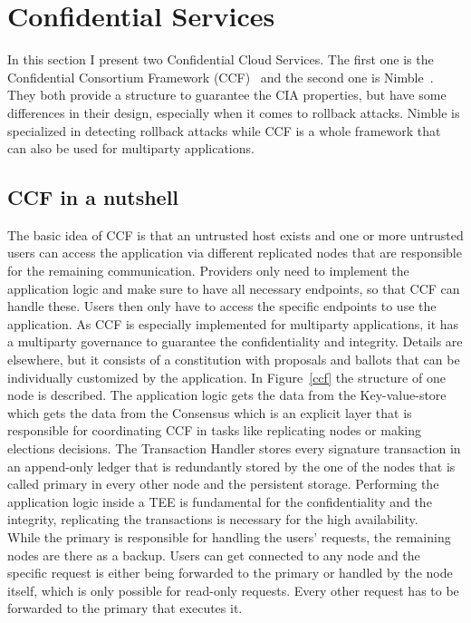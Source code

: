 \section{Confidential Services}
In this section I present two Confidential Cloud Services. The first one is the Confidential Consortium Framework (CCF)~\cite{Howard} and the second one is Nimble~\cite{Nimble}. They both provide a structure to guarantee the CIA properties, but have some differences in their design, especially when it comes to rollback attacks. Nimble is specialized in detecting rollback attacks while CCF is a whole framework that can also be used for multiparty applications.

\subsection{CCF in a nutshell}
The basic idea of CCF is that an untrusted host exists and one or more untrusted users can access the application via different replicated nodes that are responsible for the remaining communication. Providers only need to implement the application logic and make sure to have all necessary endpoints, so that CCF can handle these. Users then only have to access the specific endpoints to use the application. As CCF is especially implemented for multiparty applications, it has a multiparty governance to guarantee the confidentiality and integrity. Details are elsewhere, but it consists of a constitution with proposals and ballots that can be individually customized by the application. In Figure~\ref{ccf} the structure of one node is described. The application logic gets the data from the Key-value-store which gets the data from the Consensus which is an explicit layer that is responsible for coordinating CCF in tasks like replicating nodes or making elections decisions.
  The Transaction Handler stores every signature transaction in an append-only ledger that is redundantly stored by the one of the nodes that is called primary in every other node and the persistent storage. Performing the application logic inside a TEE is fundamental for the confidentiality and the integrity, replicating the transactions is necessary for the high availability.\\ %
While the primary is responsible for handling the users' requests, the remaining nodes are there as a backup. Users can get connected to any node and the specific request is either being forwarded to the primary or handled by the node itself, which is only possible for read-only requests. Every other request has to be forwarded to the primary that executes it.\\
